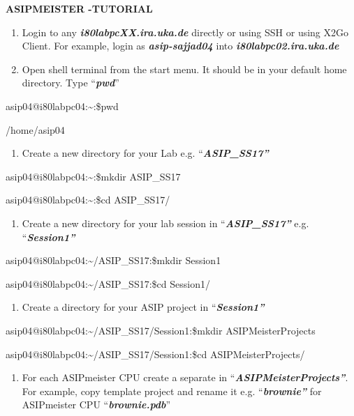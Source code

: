\documentclass[
]{article}
\author{}
\date{}
\begin{document}
\textbf{ASIPMEISTER -TUTORIAL}

\begin{enumerate}
\def\labelenumi{\arabic{enumi}.}
\item
  Login to any \emph{\textbf{i80labpcXX.ira.uka.de}} directly or using
  SSH or using X2Go Client. For example, login as
  \emph{\textbf{asip-sajjad04}} into
  \emph{\textbf{i80labpc02.ira.uka.de}}
\item
  Open shell terminal from the start menu. It should be in your default
  home directory. Type ``\emph{\textbf{pwd}}''
\end{enumerate}

asip04@i80labpc04:\textasciitilde:\$pwd

/home/asip04

\begin{enumerate}
\def\labelenumi{\arabic{enumi}.}
\setcounter{enumi}{2}
\item
  Create a new directory for your Lab e.g.
  ``\emph{\textbf{ASIP\_SS17''}}
\end{enumerate}

asip04@i80labpc04:\textasciitilde:\$mkdir ASIP\_SS17

asip04@i80labpc04:\textasciitilde:\$cd ASIP\_SS17/

\begin{enumerate}
\def\labelenumi{\arabic{enumi}.}
\setcounter{enumi}{3}
\item
  Create a new directory for your lab session in
  ``\emph{\textbf{ASIP\_SS17''}} e.g. ``\emph{\textbf{Session1''}}
\end{enumerate}

asip04@i80labpc04:\textasciitilde/ASIP\_SS17:\$mkdir Session1

asip04@i80labpc04:\textasciitilde/ASIP\_SS17:\$cd Session1/

\begin{enumerate}
\def\labelenumi{\arabic{enumi}.}
\setcounter{enumi}{4}
\item
  Create a directory for your ASIP project in
  ``\emph{\textbf{Session1''}}
\end{enumerate}

asip04@i80labpc04:\textasciitilde/ASIP\_SS17/Session1:\$mkdir
ASIPMeisterProjects

asip04@i80labpc04:\textasciitilde/ASIP\_SS17/Session1:\$cd
ASIPMeisterProjects/

\begin{enumerate}
\def\labelenumi{\arabic{enumi}.}
\setcounter{enumi}{5}
\item
  For each ASIPmeister CPU create a separate in
  ``\emph{\textbf{ASIPMeisterProjects''}}. For example, copy template
  project and rename it e.g. ``\emph{\textbf{brownie''}} for ASIPmeister
  CPU ``\emph{\textbf{brownie.pdb}}''
\end{enumerate}
\end{document}
